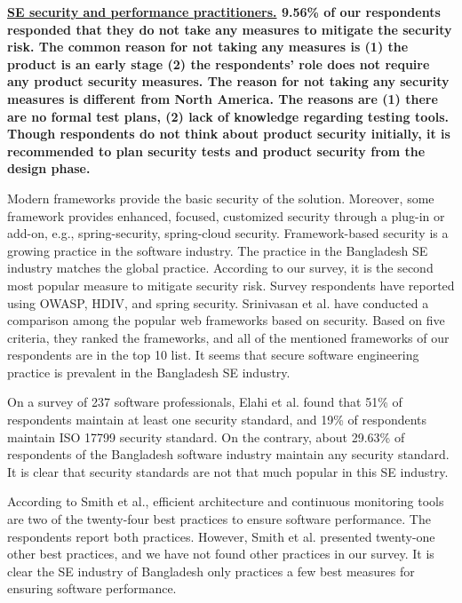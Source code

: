 \bf{\ul{SE security and performance practitioners.}} 9.56\% of our respondents
responded that they do not take any measures to mitigate the security risk. The
common reason for not taking any measures is (1) the product is an early stage
(2) the respondents' role does not require any product security measures. The
reason for not taking any security measures is different from North
America\citep{Assal2019}. The reasons are (1) there are no formal test plans,
(2) lack of knowledge regarding testing tools. Though respondents do not think
about product security initially, it is recommended\citep{Chandra2009,Azham2011}
to plan security tests and product security from the design phase.

Modern frameworks provide the basic security of the solution. Moreover, some
framework provides enhanced, focused, customized security through a plug-in or
add-on, e.g., spring-security, spring-cloud security. Framework-based security
is a growing practice in the software industry\citep{Alssir2012}. The practice
in the Bangladesh SE industry matches the global practice. According to our
survey, it is the second most popular measure to mitigate security risk. Survey
respondents have reported using OWASP, HDIV, and spring security. Srinivasan et
al.\citep{Srinivasan2017} have conducted a comparison among the popular web
frameworks based on security. Based on five criteria, they ranked the
frameworks, and all of the mentioned frameworks of our respondents are in the
top 10 list. It seems that secure software engineering practice is prevalent in
the Bangladesh SE industry.


On a survey of 237 software professionals, Elahi et al.\citep{Elahi2011} found
that 51\% of respondents maintain at least one security standard, and 19\% of
respondents maintain ISO 17799 security standard. On the contrary, about 29.63\%
of respondents of the Bangladesh software industry maintain any security
standard. It is clear that security standards are not that much popular in this
SE industry.

According to Smith et al.\citep{Smith2003}, efficient architecture and
continuous monitoring tools are two of the twenty-four best practices to ensure
software performance. The respondents report both practices. However, Smith et
al. presented twenty-one other best practices, and we have not found other
practices in our survey. It is clear the SE industry of Bangladesh only
practices a few best measures for ensuring software performance.



